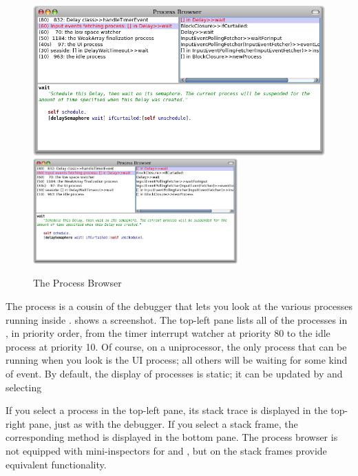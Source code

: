 \documentclass[a4paper,10pt,twoside]{book}
\begin{document}
\begin{figure}[btp]
	\begin{center}
	\ifluluelse
		{\includegraphics[width=\textwidth]{processBrowser}}
		{\includegraphics[width=0.7\textwidth]{processBrowser}}
	\end{center}
	\caption{The Process Browser}
\end{figure}

The process  is a cousin of the debugger that lets you look at the various processes running inside \pharo.
 shows a screenshot.
The top-left pane lists all of the processes in \pharo, in priority order, from the timer interrupt watcher at priority 80 to the idle process at priority 10.
Of course, on a uniprocessor, the only process that can be running when you look is the UI process; all others will be waiting for some kind of event.
By default, the display of processes is static; it can be updated by  and selecting 

If you select a process in the top-left pane, its stack trace is displayed in the top-right pane, just as with the debugger.
If you select a stack frame, the corresponding method is displayed in the bottom pane.
The process browser is not equipped with mini-inspectors for \self and , but  on the stack frames provide equivalent functionality.
\end{document}
